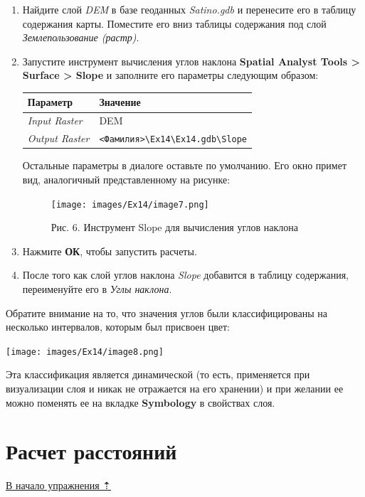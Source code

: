 \documentclass[12pt,]{book}
\begin{document}
\begin{enumerate}
\def\labelenumi{\arabic{enumi}.}
\item
  Найдите слой \emph{DEM} в базе геоданных \emph{Satino.gdb} и перенесите его в таблицу содержания карты. Поместите его вниз таблицы содержания под слой \emph{Землепользование (растр)}.
\item
  Запустите инструмент вычисления углов наклона \textbf{Spatial Analyst Tools \textgreater{} Surface \textgreater{} Slope} и заполните его параметры следующим образом:

  \begin{longtable}[]{@{}ll@{}}
  \toprule
  Параметр & Значение\tabularnewline
  \midrule
  \endhead
  \emph{Input Raster} & DEM\tabularnewline
  \emph{Output Raster} & \texttt{\textless{}Фамилия\textgreater{}\textbackslash{}Ex14\textbackslash{}Ex14.gdb\textbackslash{}Slope}\tabularnewline
  \bottomrule
  \end{longtable}

  Остальные параметры в диалоге оставьте по умолчанию. Его окно примет вид, аналогичный представленному на рисунке:

  \begin{figure}
  \centering
  \texttt{[image: images/Ex14/image7.png]}
  \caption{Рис. 6. Инструмент Slope для вычисления углов наклона}
  \end{figure}
\item
  Нажмите \textbf{ОК}, чтобы запустить расчеты.
\item
  После того как слой углов наклона \emph{Slope} добавится в таблицу содержания, переименуйте его в \emph{Углы наклона}.
\end{enumerate}

Обратите внимание на то, что значения углов были классифицированы на несколько интервалов, которым был присвоен цвет:

\texttt{[image: images/Ex14/image8.png]}

Эта классификация является динамической (то есть, применяется при визуализации слоя и никак не отражается на его хранении) и при желании ее можно поменять ее на вкладке \textbf{Symbology} в свойствах слоя.

\hypertarget{weighted-overlay-distances}{%
\section{Расчет расстояний}\label{weighted-overlay-distances}}

\protect\hyperlink{weighted-overlay}{В начало упражнения ⇡}
\end{document}
